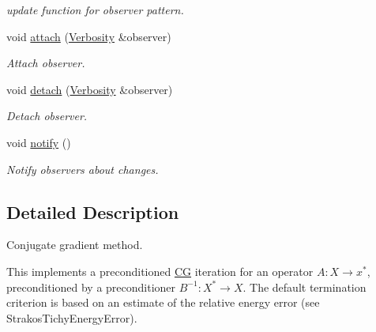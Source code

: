 \begin{DoxyCompactItemize}
\begin{DoxyCompactList}\small\item\em update function for observer pattern. \end{DoxyCompactList}\item 
\hypertarget{classSpacy_1_1Mixin_1_1MixinConnection_abb5520ee6b22dd993d78f142939a1ed4}{void \hyperlink{classSpacy_1_1Mixin_1_1MixinConnection_abb5520ee6b22dd993d78f142939a1ed4}{attach} (\hyperlink{classSpacy_1_1Mixin_1_1Verbosity_aefe2f237b0456c4bced001fbfa75f92e}{Verbosity} \&observer)}\label{classSpacy_1_1Mixin_1_1MixinConnection_abb5520ee6b22dd993d78f142939a1ed4}

\begin{DoxyCompactList}\small\item\em Attach observer. \end{DoxyCompactList}\item 
\hypertarget{classSpacy_1_1Mixin_1_1MixinConnection_adda739590c487679c26f60e50aedb73f}{void \hyperlink{classSpacy_1_1Mixin_1_1MixinConnection_adda739590c487679c26f60e50aedb73f}{detach} (\hyperlink{classSpacy_1_1Mixin_1_1Verbosity_aefe2f237b0456c4bced001fbfa75f92e}{Verbosity} \&observer)}\label{classSpacy_1_1Mixin_1_1MixinConnection_adda739590c487679c26f60e50aedb73f}

\begin{DoxyCompactList}\small\item\em Detach observer. \end{DoxyCompactList}\item 
\hypertarget{classSpacy_1_1Mixin_1_1MixinConnection_a1ddeaa78a3bb4a38c2cca36d1f99fe36}{void \hyperlink{classSpacy_1_1Mixin_1_1MixinConnection_a1ddeaa78a3bb4a38c2cca36d1f99fe36}{notify} ()}\label{classSpacy_1_1Mixin_1_1MixinConnection_a1ddeaa78a3bb4a38c2cca36d1f99fe36}

\begin{DoxyCompactList}\small\item\em Notify observers about changes. \end{DoxyCompactList}\end{DoxyCompactItemize}


\subsection{Detailed Description}
Conjugate gradient method. 

This implements a preconditioned \hyperlink{namespaceSpacy_1_1CG}{C\-G} iteration for an operator $ A: X\to x^* $, preconditioned by a preconditioner $ B^{-1}: X^* \to X $. The default termination criterion is based on an estimate of the relative energy error (see Strakos\-Tichy\-Energy\-Error).

